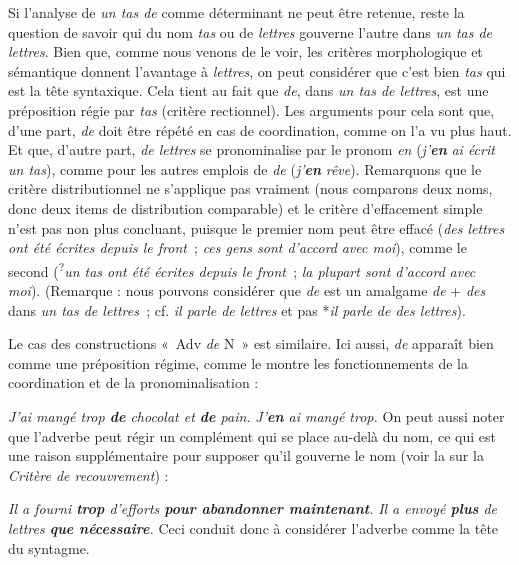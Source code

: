 {    Si l’analyse de \textit{un tas de} comme déterminant ne peut être retenue, reste la question de savoir qui du nom \textit{tas} ou de \textit{lettres} gouverne l’autre dans \textit{un tas de lettres}. Bien que, comme nous venons de le voir, les critères morphologique et sémantique donnent l’avantage à \textit{lettres}, on peut considérer que c’est bien \textit{tas} qui est la tête syntaxique. Cela tient au fait que \textit{de}, dans \textit{un tas de lettres}, est une préposition régie par \textit{tas} (critère rectionnel). Les arguments pour cela sont que, d’une part, \textit{de} doit être répété en cas de coordination, comme on l’a vu plus haut. Et que, d’autre part, \textit{de lettres} se pronominalise par le pronom \textit{en} (\textit{j’}\textbf{\textit{en}} \textit{ai écrit un tas}), comme pour les autres emplois de \textit{de} (\textit{j’}\textbf{\textit{en}} \textit{rêve}). Remarquons que le critère distributionnel ne s’applique pas vraiment (nous comparons deux noms, donc deux items de distribution comparable) et le critère d’effacement simple n’est pas non plus concluant, puisque le premier nom peut être effacé (\textit{des lettres ont été écrites depuis le front~}; \textit{ces gens sont d’accord} \textit{avec moi}), comme le second (\textsuperscript{?}\textit{un tas ont été écrites depuis le front~}; \textit{la plupart sont d’accord} \textit{avec moi}). (Remarque : nous pouvons considérer que \textit{de} est un amalgame \textit{de} + \textit{des} dans \textit{un tas de lettres~}; cf. \textit{il parle de lettres} et pas *\textit{il parle de des lettres}).

    Le cas des constructions «~Adv \textit{de} N~» est similaire. Ici aussi, \textit{de} apparaît bien comme une préposition régime, comme le montre les fonctionnements de la coordination et de la pronominalisation :
    
    \ea
      \ea \textit{{J’ai mangé trop} \textbf{{de}} {chocolat et} \textbf{{de}}  {pain.}}
      \ex \textit{{J’}\textbf{{en}} ai mangé trop.}
      \z
    \z
    On peut aussi noter que l’adverbe peut régir un complément qui se place au-delà du nom, ce qui est une raison supplémentaire pour supposer qu’il gouverne le nom (voir la  sur la \textit{Critère de recouvrement}) :
    
    \ea
      \ea \textit{{Il a fourni} \textbf{{trop}}  {d’efforts} \textbf{{pour abandonner maintenant}}.}
      \ex \textit{{Il a envoyé} \textbf{{plus}}  {de lettres} \textbf{{que nécessaire}}.}
      \z
    \z
    Ceci conduit donc à considérer l’adverbe comme la tête du syntagme.

}
